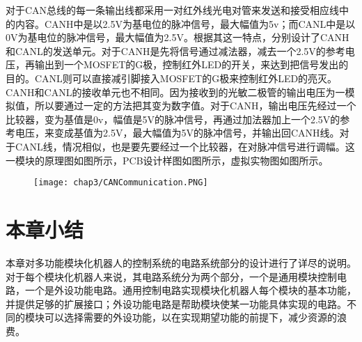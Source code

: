 对于CAN总线的每一条输出线都采用一对红外线光电对管来发送和接受相应线中的内容。CANH中是以2.5V为基电位的脉冲信号，最大幅值为5v；而CANL中是以0V为基电位的脉冲信号，最大幅值为2.5V。根据其这一特点，分别设计了CANH和CANL的发送单元。对于CANH是先将信号通过减法器，减去一个2.5V的参考电压，再输出到一个MOSFET的G极，控制红外LED的开关，来达到把信号发出的目的。CANL则可以直接减引脚接入MOSFET的G极来控制红外LED的亮灭。CANH和CANL的接收单元也不相同。因为接收到的光敏二极管的输出电压为一模拟值，所以要通过一定的方法把其变为数字值。对于CANH，输出电压先经过一个比较器，变为基值是0v，幅值是5V的脉冲信号，再通过加法器加上一个2.5V的参考电压，来变成基值为2.5V，最大幅值为5V的脉冲信号，并输出回CANH线。对于CANL线，情况相似，也是要先要经过一个比较器，在对脉冲信号进行调幅。这一模块的原理图如图所示，PCB设计样图如图所示，虚拟实物图如图所示。
\begin{figure}[!htp]
  \centering
  \texttt{[image: chap3/CANCommunication.PNG]}
\end{figure}
\begin{figure}
  \centering
  \hspace{1in}
\end{figure}
\begin{figure}
  \centering
  \hspace{1in}
\end{figure}
\section{本章小结}
本章对多功能模块化机器人的控制系统的电路系统部分的设计进行了详尽的说明。对于每个模块化机器人来说，其电路系统分为两个部分，一个是通用模块控制电路，一个是外设功能电路。通用控制电路实现模块化机器人每个模块的基本功能，并提供足够的扩展接口；外设功能电路是帮助模块使某一功能具体实现的电路。不同的模块可以选择需要的外设功能，以在实现期望功能的前提下，减少资源的浪费。

